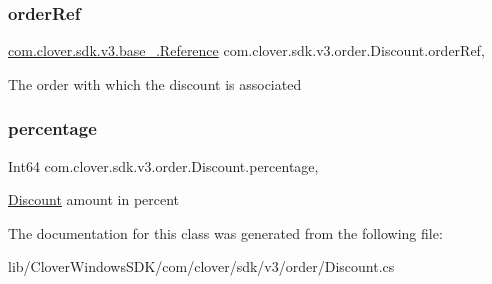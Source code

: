 \subsubsection{\texorpdfstring{order\+Ref}{orderRef}}
{\footnotesize\ttfamily \hyperlink{classcom_1_1clover_1_1sdk_1_1v3_1_1base___1_1_reference}{com.\+clover.\+sdk.\+v3.\+base\+\_\+.\+Reference} com.\+clover.\+sdk.\+v3.\+order.\+Discount.\+order\+Ref\hspace{0.3cm}{\ttfamily [get]}, {\ttfamily [set]}}



The order with which the discount is associated 

\mbox{\label{classcom_1_1clover_1_1sdk_1_1v3_1_1order_1_1_discount_a060312534890beb01ad9cc302ecc141f}} 
\subsubsection{\texorpdfstring{percentage}{percentage}}
{\footnotesize\ttfamily Int64 com.\+clover.\+sdk.\+v3.\+order.\+Discount.\+percentage\hspace{0.3cm}{\ttfamily [get]}, {\ttfamily [set]}}



\hyperlink{classcom_1_1clover_1_1sdk_1_1v3_1_1order_1_1_discount}{Discount} amount in percent 



The documentation for this class was generated from the following file\+:\begin{DoxyCompactItemize}
\item 
lib/\+Clover\+Windows\+S\+D\+K/com/clover/sdk/v3/order/Discount.\+cs\end{DoxyCompactItemize}
